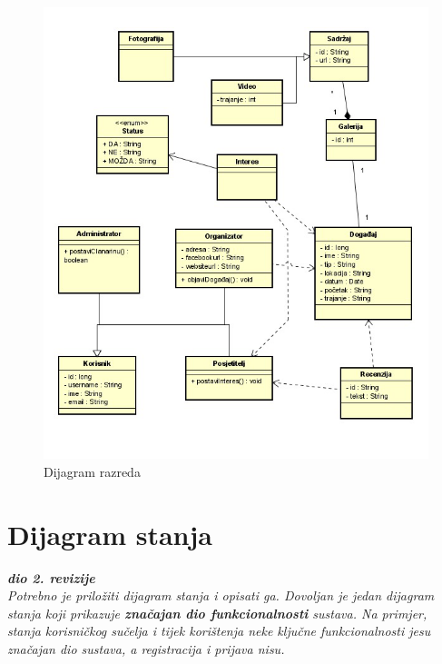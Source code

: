 		
		\begin{figure}[H]
			\includegraphics[width=\textwidth]{slike/Dijagram_razreda.PNG} %
			\caption{Dijagram razreda}
			\label{fig:promjene2} %
		\end{figure}
			
			
			
			\eject
		
		\section{Dijagram stanja}
			
			
			\textbf{\textit{dio 2. revizije}}\\
			
			\textit{Potrebno je priložiti dijagram stanja i opisati ga. Dovoljan je jedan dijagram stanja koji prikazuje \textbf{značajan dio funkcionalnosti} sustava. Na primjer, stanja korisničkog sučelja i tijek korištenja neke ključne funkcionalnosti jesu značajan dio sustava, a registracija i prijava nisu. }
			
			
			\eject 
		

